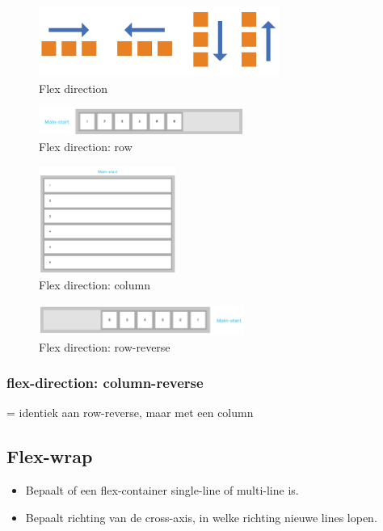 \documentclass{article}
\begin{document}
\begin{figure}[H]
    \centering
    \includegraphics[width=0.7\textwidth]{img/Screenshot_20200330_112728.png}
    \caption{Flex direction}
\end{figure}

\begin{figure}[H]
    \centering
    \includegraphics[width=0.6\textwidth]{img/Screenshot_20200427_092621.png}
    \caption{Flex direction: row}
\end{figure}

\begin{figure}[H]
    \centering
    \includegraphics[width=0.4\textwidth]{img/Screenshot_20200427_092708.png}
    \caption{Flex direction: column}
\end{figure}

\begin{figure}[H]
    \centering
    \includegraphics[width=0.6\textwidth]{img/Screenshot_20200427_092800.png}
    \caption{Flex direction: row-reverse}
\end{figure}


\subsubsection{flex-direction: column-reverse}
= identiek aan row-reverse, maar met een column

\subsection{Flex-wrap}
\begin{itemize}
    \item Bepaalt of een flex-container single-line of multi-line is.
    \item Bepaalt richting van de cross-axis, in welke richting nieuwe lines lopen.
\end{itemize}
\end{document}
